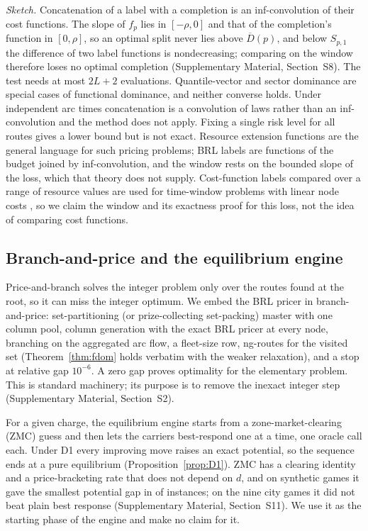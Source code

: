 \documentclass[preprint,11pt]{elsarticle}
\theoremstyle{definition}
\theoremstyle{remark}
\newcommand{\Dh}{\overline{D}}
\newcommand{\SM}[1]{Supplementary Material, Section~#1}
\begin{document}
\emph{Sketch.} Concatenation of a label with a completion is an inf-convolution of their cost functions. The slope of $f_p$ lies in $[-\rho,0]$ and that of the completion's function in $[0,\rho]$, so an optimal split never lies above $\Dh(p)$, and below $S_{p,1}$ the difference of two label functions is nondecreasing; comparing on the window therefore loses no optimal completion (\SM{S8}). The test needs at most $2L+2$ evaluations. Quantile-vector and sector dominance are special cases of functional dominance, and neither converse holds. Under independent arc times concatenation is a convolution of laws rather than an inf-convolution and the method does not apply. Fixing a single risk level for all routes gives a lower bound but is not exact. Resource extension functions \citep{Irnich2008} are the general language for such pricing problems; BRL labels are functions of the budget joined by inf-convolution, and the window rests on the bounded slope of the loss, which that theory does not supply. Cost-function labels compared over a range of resource values are used for time-window problems with linear node costs \citep{Ioachim1998}, so we claim the window and its exactness proof for this loss, not the idea of comparing cost functions.

\subsection{Branch-and-price and the equilibrium engine}\label{sec:bp}\label{sec:engine}

Price-and-branch solves the integer problem only over the routes found at the root, so it can miss the integer optimum. We embed the BRL pricer in branch-and-price: set-partitioning (or prize-collecting set-packing) master with one column pool, column generation with the exact BRL pricer at every node, branching on the aggregated arc flow, a fleet-size row, ng-routes \citep{Baldacci2011} for the visited set (Theorem~\ref{thm:fdom} holds verbatim with the weaker relaxation), and a stop at relative gap $10^{-6}$. A zero gap proves optimality for the elementary problem. This is standard machinery; its purpose is to remove the inexact integer step (\SM{S2}).

For a given charge, the equilibrium engine starts from a zone-market-clearing (ZMC) guess and then lets the carriers best-respond one at a time, one oracle call each. Under D1 every improving move raises an exact potential, so the sequence ends at a pure equilibrium (Proposition~\ref{prop:D1}). ZMC has a clearing identity and a price-bracketing rate that does not depend on $d$, and on synthetic games it gave the smallest potential gap in \ZMCsynthWins{} of \ZMCsynthN{} instances; on the nine city games it did not beat plain best response (\SM{S11}). We use it as the starting phase of the engine and make no claim for it.
\end{document}
